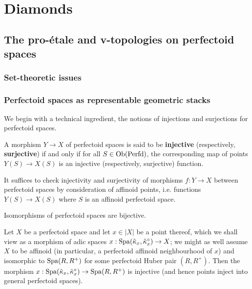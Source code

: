 \section{Diamonds}
    \subsection{The pro-\'etale and v-topologies on perfectoid spaces}
        \subsubsection{Set-theoretic issues}
        
        \subsubsection{Perfectoid spaces as representable geometric stacks}
            We begin with a technical ingredient, the notions of injections and surjections for perfectoid spaces. 
            \begin{definition} \label{def: injections_and_surjections_between_perfectoid_spaces}
                A morphism $Y \to X$ of perfectoid spaces is said to be \textbf{injective} (respectively, \textbf{surjective}) if and only if for all $S \in \mathrm{Ob}(\mathrm{Perfd})$, the corresponding map of points $Y(S) \to X(S)$ is an injective (respectively, surjective) function.
            \end{definition}
            \begin{remark}
                It suffices to check injectivity and surjectivity of morphisms $f: Y \to X$ between perfectoid spaces by consideration of affinoid points, i.e. functions $Y(S) \to X(S)$ where $S$ is an affinoid perfectoid space. 
            \end{remark}
            \begin{remark}
                Isomorphisms of perfectoid spaces are bijective.
            \end{remark}
            \begin{example}[Points]
                Let $X$ be a perfectoid space and let $x \in |X|$ be a point thereof, which we shall view as a morphism of adic spaces $x: \mathrm{Spa}(\hat{\kappa}_x, \hat{\kappa}_x^{\circ}) \to X$; we might as well assume $X$ to be affinoid (in particular, a perfectoid affinoid neighbourhood of $x$) and isomorphic to $\mathrm{Spa}(R, R^+)$ for some perfectoid Huber pair $(R, R^+)$. Then the morphism $x: \mathrm{Spa}(\hat{\kappa}_x, \hat{\kappa}_x^{\circ}) \to \mathrm{Spa}(R, R^+)$ is injective (and hence points inject into general perfectoid spaces).
            \end{example}
